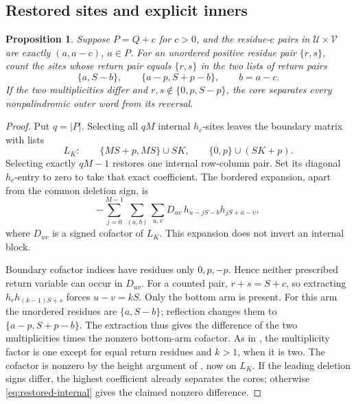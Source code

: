\documentclass[11pt,a4paper]{amsart}
\numberwithin{equation}{section}
\theoremstyle{plain}
\newtheorem{proposition}[theorem]{Proposition}
\theoremstyle{definition}
\begin{document}
\subsection{Restored sites and explicit inners}

\begin{proposition}\label{prop:restored-site}
Suppose \(P=Q+c\) for \(c>0\), and the residue-\(c\) pairs in \(\mathcal U\times\mathcal V\) are exactly \((a,a-c)\), \(a\in P\).  For an unordered positive residue pair \(\{r,s\}\), count the sites whose return pair equals \(\{r,s\}\) in the two lists of return pairs
\begin{equation}\label{eq:return-pairs}
 \{a,S-b\},\qquad \{a-p,S+p-b\},\qquad b=a-c.
\end{equation}
If the two multiplicities differ and \(r,s\notin\{0,p,S-p\}\), the core separates every nonpalindromic outer word from its reversal.
\end{proposition}
\begin{proof}
Put \(q=|P|\).  Selecting all \(qM\) internal \(h_c\)-sites leaves the boundary matrix with lists
\begin{equation}\label{eq:boundary-matrix}
 L_K:\qquad \{MS+p,MS\}\cup SK,\qquad
 \{0,p\}\cup(SK+p).
\end{equation}
Selecting exactly \(qM-1\) restores one internal row-column pair.  Set its diagonal \(h_c\)-entry to zero to take that exact coefficient.  The bordered expansion, apart from the common deletion sign, is
\begin{equation}\label{eq:restored-internal}
 -\sum_{j=0}^{M-1}\sum_{(a,b)}\sum_{u,v}
 D_{uv}\,h_{u-jS-b}h_{jS+a-v},
\end{equation}
where \(D_{uv}\) is a signed cofactor of \(L_K\).  This expansion does not invert an internal block.

Boundary cofactor indices have residues only \(0,p,-p\).  Hence neither prescribed return variable can occur in \(D_{uv}\).  For a counted pair, \(r+s=S+c\), so extracting \(h_rh_{(k-1)S+s}\) forces \(u-v=kS\).  Only the bottom arm is present.  For this arm the unordered residues are \(\{a,S-b\}\); reflection changes them to \(\{a-p,S+p-b\}\).  The extraction thus gives the difference of the two multiplicities times the nonzero bottom-arm cofactor.  As in , the multiplicity factor is one except for equal return residues and \(k>1\), when it is two.  The cofactor is nonzero by the height argument of , now on \(L_K\).  If the leading deletion signs differ, the highest coefficient already separates the cores; otherwise \eqref{eq:restored-internal} gives the claimed nonzero difference.
\end{proof}
\end{document}
